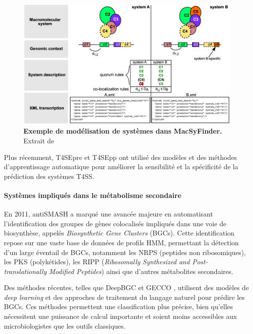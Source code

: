 \begin{figure}[htbp]
    \centering
    \includegraphics[width=\linewidth]{images/macsyfinder.png}
    \caption[Exemple de modélisation de systèmes dans MacSyFinder]{\textbf{Exemple de modélisation de systèmes dans MacSyFinder.} Extrait de \cite{abby_macsyfinder_2014}}
    \label{fig:macsyfinder}
\end{figure}

Plus récemment, T4SEpre \cite{wang_prediction_2014} et T4SEpp \cite{hu_t4sepp_2024} ont utilisé des modèles et des méthodes d'apprentissage automatique pour améliorer la sensibilité et la spécificité de la prédiction des systèmes T4SS.

\paragraph{Systèmes impliqués dans le métabolisme secondaire}

En 2011, antiSMASH \cite{medema_antismash_2011} a marqué une avancée majeure en automatisant l'identification des groupes de gènes colocalisés impliqués dans une voie de biosynthèse, appelés \textit{Biosynthetic Gene Clusters} (BGCs). Cette identification repose sur une vaste base de données de profils HMM, permettant la détection d'un large éventail de BGCs, notamment les NRPS (peptides non ribosomiques), les PKS (polykétides), les RIPP (\textit{Ribosomally Synthesized and Post-translationally Modified Peptides}) ainsi que d'autres métabolites secondaires.

Des méthodes récentes, telles que DeepBGC \cite{hannigan_deep_2019} et GECCO \cite{carroll_accurate_2021}, utilisent des modèles de \textit{deep learning} et des approches de traitement du langage naturel pour prédire les BGCs. Ces méthodes permettent une classification plus précise, bien qu'elles nécessitent une puissance de calcul importante et soient moins accessibles aux microbiologistes que les outils classiques.

